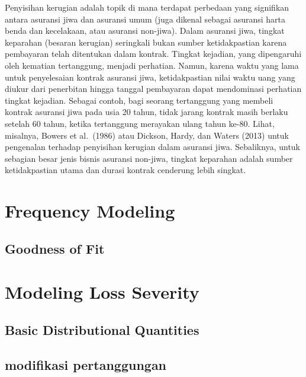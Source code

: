 \documentclass[
]{book}
\begin{document}
Penyisihan kerugian adalah topik di mana terdapat perbedaan yang signifikan antara asuransi jiwa dan asuransi umum (juga dikenal sebagai asuransi harta benda dan kecelakaan, atau asuransi non-jiwa). Dalam asuransi jiwa, tingkat keparahan (besaran kerugian) seringkali bukan sumber ketidakpastian karena pembayaran telah ditentukan dalam kontrak. Tingkat kejadian, yang dipengaruhi oleh kematian tertanggung, menjadi perhatian. Namun, karena waktu yang lama untuk penyelesaian kontrak asuransi jiwa, ketidakpastian nilai waktu uang yang diukur dari penerbitan hingga tanggal pembayaran dapat mendominasi perhatian tingkat kejadian. Sebagai contoh, bagi seorang tertanggung yang membeli kontrak asuransi jiwa pada usia 20 tahun, tidak jarang kontrak masih berlaku setelah 60 tahun, ketika tertanggung merayakan ulang tahun ke-80. Lihat, misalnya, Bowers et al.~(1986) atau Dickson, Hardy, dan Waters (2013) untuk pengenalan terhadap penyisihan kerugian dalam asuransi jiwa. Sebaliknya, untuk sebagian besar jenis bisnis asuransi non-jiwa, tingkat keparahan adalah sumber ketidakpastian utama dan durasi kontrak cenderung lebih singkat.

\hypertarget{frequency-modeling}{%
\chapter{Frequency Modeling}\label{frequency-modeling}}

\hypertarget{goodness-of-fit}{%
\section{Goodness of Fit}\label{goodness-of-fit}}

\hypertarget{modeling-loss-severity}{%
\chapter{Modeling Loss Severity}\label{modeling-loss-severity}}

\hypertarget{basic-distributional-quantities}{%
\section{Basic Distributional Quantities}\label{basic-distributional-quantities}}

\hypertarget{modifikasi-pertanggungan}{%
\section{modifikasi pertanggungan}\label{modifikasi-pertanggungan}}
\end{document}
